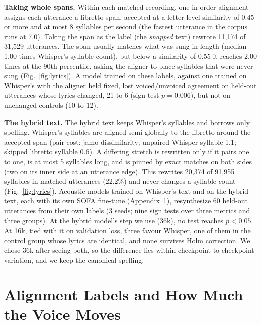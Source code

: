 \documentclass[wcp]{jmlr}
\begin{document}
\textbf{Taking whole spans.} Within each matched recording, one in-order alignment assigns
each utterance a libretto span, accepted at a letter-level similarity of 0.45 or more and
at most 8 syllables per second (the fastest utterance in the corpus runs at 7.0). Taking
the span as the label (the \emph{snapped} text) rewrote 11,174 of 31,529 utterances. The
span usually matches what was sung in length (median 1.00 times Whisper's syllable count),
but below a similarity of 0.55 it reaches 2.00 times at the 90th percentile, asking the
aligner to place syllables that were never sung (Fig.~\ref{fig:lyrics}). A model trained
on these labels, against one trained on Whisper's with the aligner held fixed, lost
voiced/unvoiced agreement on held-out utterances whose lyrics changed, 21 to 6 (sign test
$p{=}0.006$), but not on unchanged controls (10 to 12).

\textbf{The hybrid text.} The hybrid text keeps Whisper's syllables and borrows only
spelling. Whisper's syllables are aligned semi-globally to the libretto around the accepted
span (pair cost: jamo dissimilarity; unpaired Whisper syllable 1.1; skipped libretto
syllable 0.6). A differing stretch is rewritten only if it pairs one to one, is at most
5 syllables long, and is pinned by exact matches on both sides (two on its inner side at an
utterance edge). This rewrites 20,374 of 91,955 syllables in matched utterances (22.2\%)
and never changes a syllable count (Fig.~\ref{fig:lyrics}). Acoustic models trained on Whisper's
text and on the hybrid text, each with its own SOFA fine-tune (Appendix~\ref{apd:sigimsae}),
resynthesize 60 held-out utterances from their own labels (3 seeds; nine sign tests over
three metrics and three groups). At the hybrid model's step we use (36k), no test reaches
$p{<}0.05$. At 16k, tied with it on validation loss, three favour Whisper, one of them in
the control group whose lyrics are identical, and none survives Holm correction. We chose
36k after seeing both, so the difference lies within checkpoint-to-checkpoint variation,
and we keep the canonical spelling.

\section{Alignment Labels and How Much the Voice Moves}\label{apd:sigimsae}
\end{document}
